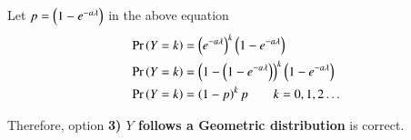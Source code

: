 \documentclass[journal,12pt,twocolumn]{IEEEtran}
\begin{document}
Let $p=\left(1-e^{-a\lambda}\right)$ in the above equation
\begin{align}
    \Pr\left(Y=k\right) &= \left(e^{-a\lambda}\right)^k\left(1-e^{-a\lambda}\right)\\
    \Pr\left(Y=k\right) &= \left(1-\left(1-e^{-a\lambda}\right)\right)^k\left(1-e^{-a\lambda}\right)\\
    \Pr\left(Y=k\right) &= \left(1-p\right)^kp \qquad k=0,1,2\ldots
\end{align}

Therefore, option \textbf{3) $Y$ follows a Geometric distribution} is correct.
\end{document}
